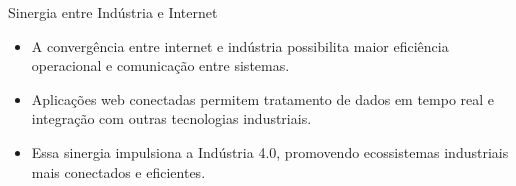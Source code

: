 \begin{frame}{Sinergia entre Indústria e Internet}
    \begin{itemize}
        \item A convergência entre internet e indústria possibilita maior eficiência operacional e comunicação entre sistemas.
        \item Aplicações web conectadas permitem tratamento de dados em tempo real e integração com outras tecnologias industriais.
        \item Essa sinergia impulsiona a Indústria 4.0, promovendo ecossistemas industriais mais conectados e eficientes.
    \end{itemize}
\end{frame}
